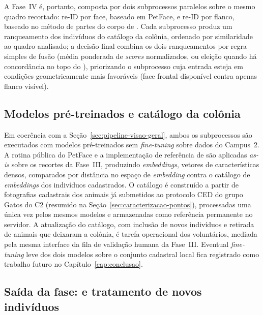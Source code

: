 A Fase~IV é, portanto, composta por dois subprocessos paralelos sobre o mesmo quadro recortado: re-ID por face, baseado em PetFace, e re-ID por flanco, baseado no método de partes do corpo de . Cada subprocesso produz um ranqueamento dos indivíduos do catálogo da colônia, ordenado por similaridade ao quadro analisado; a decisão final combina os dois ranqueamentos por regra simples de fusão (média ponderada de \textit{scores} normalizados, ou eleição quando há concordância no topo do ), priorizando o subprocesso cuja entrada esteja em condições geometricamente mais favoráveis (face frontal disponível contra apenas flanco visível).

\subsection*{Modelos pré-treinados e catálogo da colônia}

Em coerência com a Seção~\ref{sec:pipeline-visao-geral}, ambos os subprocessos são executados com modelos pré-treinados sem \textit{fine-tuning} sobre dados do Campus~2. A rotina pública do PetFace e a implementação de referência de  são aplicadas \textit{as-is} sobre os recortes da Fase~III, produzindo \textit{embeddings}, vetores de características densos, comparados por distância no espaço de \textit{embedding} contra o catálogo de \textit{embeddings} dos indivíduos cadastrados. O catálogo é construído a partir de fotografias cadastrais dos animais já submetidos ao protocolo CED do grupo Gatos do C2 (resumido na Seção~\ref{sec:caracterizacao-pontos}), processadas uma única vez pelos mesmos modelos e armazenadas como referência permanente no servidor. A atualização do catálogo, com inclusão de novos indivíduos e retirada de animais que deixaram a colônia, é tarefa operacional dos voluntários, mediada pela mesma interface da fila de validação humana da Fase~III. Eventual \textit{fine-tuning} leve dos dois modelos sobre o conjunto cadastral local fica registrado como trabalho futuro no Capítulo~\ref{cap:conclusao}.

\subsection*{Saída da fase: \RankK{} e tratamento de novos indivíduos}


